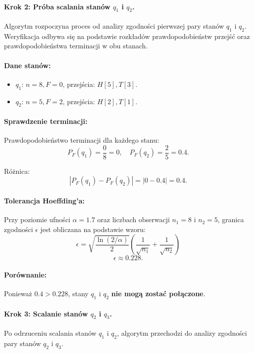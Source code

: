 \paragraph*{Krok 2: Próba scalania stanów \( q_1 \) i \( q_2 \).}  
Algorytm rozpoczyna proces od analizy zgodności pierwszej pary stanów \( q_1 \) i \( q_2 \). Weryfikacja odbywa się na podstawie rozkładów prawdopodobieństw przejść oraz prawdopodobieństwa terminacji w obu stanach.  

\paragraph*{Dane stanów:}  
\begin{itemize}  
    \item \( q_1 \): \( n = 8, F = 0 \), przejścia: \( H[5], T[3] \).  
    \item \( q_2 \): \( n = 5, F = 2 \), przejścia: \( H[2], T[1] \).  
\end{itemize}  

\paragraph*{Sprawdzenie terminacji:}  
Prawdopodobieństwo terminacji dla każdego stanu:  
\[
P_F(q_1) = \frac{0}{8} = 0, \quad P_F(q_2) = \frac{2}{5} = 0.4.
\]

Różnica:  
\[
|P_F(q_1) - P_F(q_2)| = |0 - 0.4| = 0.4.
\]

\paragraph*{Tolerancja Hoeffding’a:}  
Przy poziomie ufności \( \alpha = 1.7 \) oraz liczbach obserwacji \( n_1 = 8 \) i \( n_2 = 5 \), granica zgodności \( \epsilon \) jest obliczana na podstawie wzoru:  
\[
\epsilon = \sqrt{\frac{\ln(2 / \alpha)}{2}} \left( \frac{1}{\sqrt{n_1}} + \frac{1}{\sqrt{n_2}} \right)
\]
\[
\epsilon \approx 0.228.
\]

\paragraph*{Porównanie:}  
Ponieważ \( 0.4 > 0.228 \), stany \( q_1 \) i \( q_2 \) \textbf{nie mogą zostać połączone}.

\paragraph*{}

\paragraph*{Krok 3: Scalanie stanów \( q_2 \) i \( q_3 \).}  
Po odrzuceniu scalania stanów \( q_1 \) i \( q_2 \), algorytm przechodzi do analizy zgodności pary stanów \( q_2 \) i \( q_3 \).

